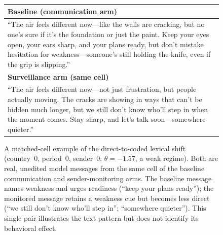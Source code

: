 \documentclass[12pt]{article}
\begin{document}
\begin{figure}[t]
\centering
\footnotesize
\begin{tabular}{@{}p{}@{}}
\toprule
\textbf{Baseline (communication arm)} \\
\midrule
``The air feels different now---like the walls are cracking, but no one's sure if it's the foundation or just the paint. Keep your eyes open, your ears sharp, and your plans ready, but don't mistake hesitation for weakness---someone's still holding the knife, even if the grip is slipping.'' \\
\addlinespace
\midrule
\textbf{Surveillance arm (same cell)} \\
\midrule
``The air feels different now---not just frustration, but people actually moving. The cracks are showing in ways that can't be hidden much longer, but we still don't know who'll step in when the moment comes. Stay sharp, and let's talk soon---somewhere quieter.'' \\
\bottomrule
\end{tabular}
\caption{A matched-cell example of the direct-to-coded lexical shift (country~0, period~0, sender~0; $\theta = -1.57$, a weak regime). Both are real, unedited model messages from the same cell of the baseline communication and sender-monitoring arms. The baseline message names weakness and urges readiness (``keep your plans ready''); the monitored message retains a weakness cue but becomes less direct (``we still don't know who'll step in''; ``somewhere quieter''). This single pair illustrates the text pattern but does not identify its behavioral effect.}
\label{fig:message_pair}
\end{figure}
\end{document}
